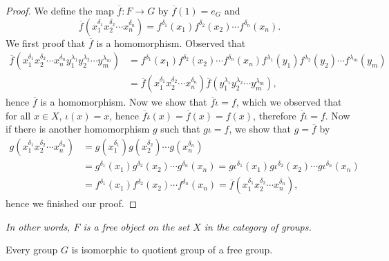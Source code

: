 \begin{proof}
We define the map $\overline{f}:F\to G$ by $\overline{f}(1)=e_G$ and 
$$\overline{f}\left( x_{1}^{\delta _1}x_{2}^{\delta _2}\cdots x_{n}^{\delta _n} \right) =f^{\delta _1}\left( x_1 \right) f^{\delta _2}\left( x_2 \right) \cdots f^{\delta _n}\left( x_n \right) .$$
We first proof that $\overline{f}$ is a homomorphism. Observed that 
$$
\begin{aligned}
\overline{f}\left( x_{1}^{\delta _1}x_{2}^{\delta _2}\cdots x_{n}^{\delta _n}y_{1}^{\lambda _1}y_{2}^{\lambda _2}\cdots y_{m}^{\lambda _m} \right) &=f^{\delta _1}\left( x_1 \right) f^{\delta _2}\left( x_2 \right) \cdots f^{\delta _n}\left( x_n \right) f^{\lambda _1}\left( y_1 \right) f^{\lambda _2}\left( y_2 \right) \cdots f^{\lambda _m}\left( y_m \right) \\
&=\overline{f}\left( x_{1}^{\delta _1}x_{2}^{\delta _2}\cdots x_{n}^{\delta _n} \right) \overline{f}\left( y_{1}^{\lambda _1}y_{2}^{\lambda _2}\cdots y_{m}^{\lambda _m} \right) ,
\end{aligned}
$$
hence $\overline{f}$ is a homomorphism. Now we show that $\overline{f}\iota=f$, which we observed that for all $x\in X$, $\iota(x)=x$, hence $\overline{f}\iota(x)=\overline{f}(x)=f(x)$, therefore $\overline{f}\iota=f$. Now if there is another homomorphism $g$ such that $g\iota=f$, we show that $g=\overline{f}$ by 
$$
\begin{aligned}
g\left( x_{1}^{\delta _1}x_{2}^{\delta _2}\cdots x_{n}^{\delta _n} \right) &=g\left( x_{1}^{\delta _1} \right) g\left( x_{2}^{\delta _2} \right) \cdots g\left( x_{n}^{\delta _n} \right)\\
&=g^{\delta _1}\left( x_1 \right) g^{\delta _2}\left( x_2 \right) \cdots g^{\delta _n}\left( x_n \right)=g\iota ^{\delta _1}\left( x_1 \right) g\iota ^{\delta _2}\left( x_2 \right) \cdots g\iota ^{\delta _n}\left( x_n \right)\\
&=f^{\delta _1}\left( x_1 \right) f^{\delta _2}\left( x_2 \right) \cdots f^{\delta _n}\left( x_n \right) =\overline{f}\left( x_{1}^{\delta _1}x_{2}^{\delta _2}\cdots x_{n}^{\delta _n} \right) ,
\end{aligned}
$$
hence we finished our proof.
\end{proof}
\begin{note}\em
In other words, $F$ is a free object on the set $X$ in the category of groups.
\end{note}
\begin{corollary}
Every group $G$ is isomorphic to quotient group of a free group.
\end{corollary}
